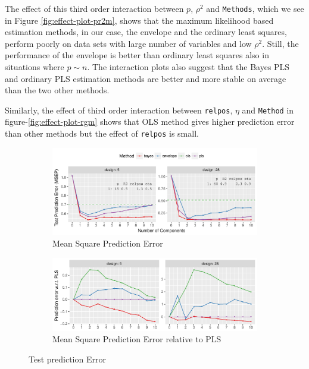 \documentclass[a4paper, 11pt]{article}
\begin{document}
The effect of this third order interaction between $p$, $\rho^2$ and {\tt Methods}, which we see in Figure \ref{fig:effect-plot-pr2m}, shows that the maximum likelihood based estimation methods, in our case, the envelope and the ordinary least squares, perform poorly on data sets with large number of variables and low $\rho^2$. Still, the performance of the envelope is better than ordinary least squares also in situations where $p\sim n$. The interaction plots also suggest that the Bayes PLS and ordinary PLS estimation methods are better and more stable on average than the two other methods.

Similarly, the effect of third order interaction between {\tt relpos}, $\eta$ and {\tt Method} in figure-\ref{fig:effect-plot-rgm} shows that OLS method gives higher prediction error than other methods but the effect of {\tt relpos} is small. 

\begin{figure}[!ht]
  \begin{subfigure}[b]{\textwidth}
    \centering
    \includegraphics[width=\textwidth]{prediction-error-selected.pdf}
    \caption{Mean Square Prediction Error}
    \label{fig:prediction-error}
  \end{subfigure}
  \begin{subfigure}[b]{\textwidth}
    \centering
    \includegraphics[width=\textwidth]{prediction-error-pls-selected.pdf}
    \caption{Mean Square Prediction Error relative to PLS}
    \label{fig:prediction-error-pls}
  \end{subfigure}
  \caption{Test prediction Error}
  \label{fig:pred-error-combined}
\end{figure}
\end{document}
